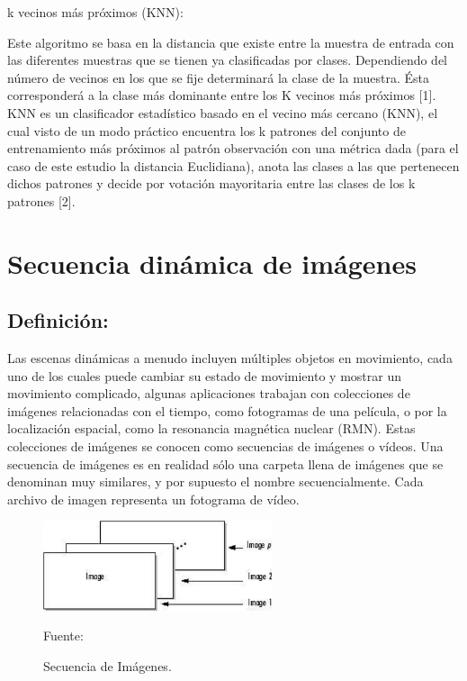 \begin{enumerate}
{\bf \item k vecinos más próximos (KNN):} \skip 0.1cm
Este algoritmo se basa en la distancia que existe entre la muestra de entrada con las diferentes muestras que se tienen ya clasificadas por clases. Dependiendo del número de vecinos en los que se fije determinará la clase de la muestra. Ésta corresponderá a la clase más dominante entre los K vecinos más próximos [1]. 
\vskip 0.1cm
KNN es un clasificador estadístico basado en el vecino más cercano (KNN), el cual visto de un modo práctico encuentra los k patrones del conjunto de entrenamiento más próximos al patrón observación con una métrica dada (para el caso de este estudio la distancia Euclidiana), anota las clases a las que pertenecen dichos patrones y decide por votación mayoritaria entre las clases de los k patrones [2].
\end{enumerate}

\section{Secuencia dinámica de imágenes}
\subsection{Definición:}
Las escenas dinámicas a menudo incluyen múltiples objetos en movimiento, cada uno de los cuales puede cambiar su estado de movimiento y mostrar un movimiento complicado, algunas aplicaciones trabajan con colecciones de imágenes relacionadas con el tiempo, como fotogramas de una película, o por la localización espacial, como la resonancia magnética nuclear (RMN). Estas colecciones de imágenes se conocen como secuencias de imágenes o vídeos.
\vskip 0.1cm
Una secuencia de imágenes es en realidad sólo una carpeta llena de imágenes que se denominan muy similares, y por supuesto el nombre secuencialmente. Cada archivo de imagen representa un fotograma de vídeo.

\begin{figure}[ht]
\begin{center}
\includegraphics[width=0.6\textwidth]{Imagen25}
\end{center}
\begin{center}
\vskip -0.5cm
\caption{\small{Secuencia de Imágenes.}}
{\small{Fuente: \cite{FALTA}}}
\end{center}
\end{figure}


